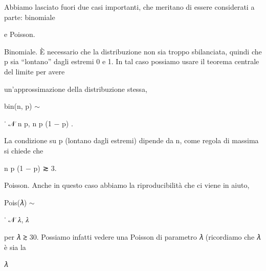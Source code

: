 \documentclass[a4paper,portrait,12pt]{article}
\begin{document}
\begin{flushleft}
Abbiamo lasciato fuori due casi importanti, che meritano di essere considerati a parte: binomiale
\end{flushleft}


\begin{flushleft}
e Poisson.
\end{flushleft}


\begin{flushleft}
Binomiale. \`{E} necessario che la distribuzione non sia troppo sbilanciata, quindi che p sia {``}lontano'' dagli estremi 0 e 1. In tal caso possiamo usare il teorema centrale del limite per avere
\end{flushleft}


\begin{flushleft}
un'approssimazione della distribuzione stessa,
\end{flushleft}


\begin{flushleft}
bin(n, p) $\sim$
\end{flushleft}


\begin{flushleft}
˙ 𝒩 n p, n p (1 $-$ p) .
\end{flushleft}


\begin{flushleft}
La condizione su p (lontano dagli estremi) dipende da n, come regola di massima si chiede che
\end{flushleft}


\begin{flushleft}
n p (1 $-$ p) ≳ 3.
\end{flushleft}


\begin{flushleft}
Poisson. Anche in questo caso abbiamo la riproducibilit\`{a} che ci viene in aiuto,
\end{flushleft}


\begin{flushleft}
Pois(𝜆) $\sim$
\end{flushleft}


\begin{flushleft}
˙ 𝒩 𝜆, 𝜆
\end{flushleft}


\begin{flushleft}
per 𝜆 ≳ 30. Possiamo infatti vedere una Poisson di parametro 𝜆 (ricordiamo che 𝜆 \`{e} sia la
\end{flushleft}


\begin{flushleft}
𝜆
\end{flushleft}
\end{document}
